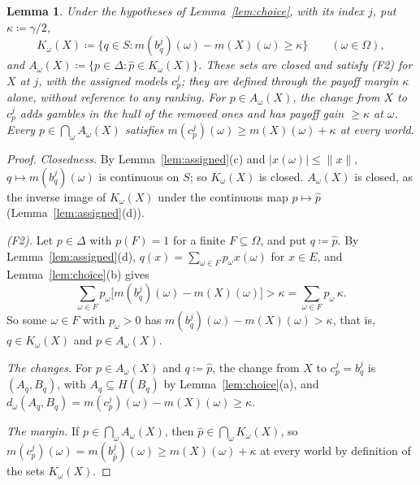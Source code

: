 \documentclass[11pt]{article}
\newtheorem{lemma}[theorem]{Lemma}
\theoremstyle{definition}
\begin{document}
\begin{lemma}\label{lem:witnesses}
Under the hypotheses of Lemma~\ref{lem:choice}, with its index $j$, put $\kappa\coloneqq\gamma/2$,
\[
K_\omega(X)\coloneqq\bigl\{q\in S:m(b^j_q)(\omega)-m(X)(\omega)\ge \kappa\bigr\}\qquad(\omega\in\Omega),
\]
and $A_\omega(X)\coloneqq\{p\in\Delta:\hat p\in K_\omega(X)\}$. {\color{red}These sets are closed and satisfy (F2) for $X$ at $j$, with the assigned models $c^j_p$; they are defined through the payoff margin $\kappa$ alone, without reference to any ranking. For $p\in A_\omega(X)$, the change from $X$ to $c^j_p$ adds gambles in the hull of the removed ones and has payoff gain $\ge\kappa$ at $\omega$.} Every $p\in\bigcap_\omega A_\omega(X)$ satisfies $m(c^j_p)(\omega)\ge m(X)(\omega)+\kappa$ at every world.
\end{lemma}
\begin{proof}
\emph{Closedness.} By Lemma~\ref{lem:assigned}(c) and $|x(\omega)|\le\|x\|$, $q\mapsto m(b^j_q)(\omega)$ is continuous on $S$; so $K_\omega(X)$ is closed. $A_\omega(X)$ is closed, as the inverse image of $K_\omega(X)$ under the continuous map $p\mapsto\hat p$ (Lemma~\ref{lem:assigned}(d)).

\emph{(F2).} Let $p\in\Delta$ with $p(F)=1$ for a finite $F\subseteq\Omega$, and put $q\coloneqq\hat p$. By Lemma~\ref{lem:assigned}(d), $q(x)=\sum_{\omega\in F}p_\omega x(\omega)$ for $x\in E$, and Lemma~\ref{lem:choice}(b) gives
\[
\sum_{\omega\in F}p_\omega\bigl[m(b^j_q)(\omega)-m(X)(\omega)\bigr]>\kappa=\sum_{\omega\in F}p_\omega\,\kappa .
\]
So some $\omega\in F$ with $p_\omega>0$ has $m(b^j_q)(\omega)-m(X)(\omega)>\kappa$, that is, $q\in K_\omega(X)$ and $p\in A_\omega(X)$.

{\color{red}\emph{The changes.} For $p\in A_\omega(X)$ and $q\coloneqq\hat p$, the change from $X$ to $c^j_p=b^j_q$ is $(A_q,B_q)$, with $A_q\subseteq H(B_q)$ by Lemma~\ref{lem:choice}(a), and $d_\omega(A_q,B_q)=m(c^j_p)(\omega)-m(X)(\omega)\ge\kappa$.}

\emph{The margin.} If $p\in\bigcap_\omega A_\omega(X)$, then $\hat p\in\bigcap_\omega K_\omega(X)$, so $m(c^j_p)(\omega)=m(b^j_{\hat p})(\omega)\ge m(X)(\omega)+\kappa$ at every world by definition of the sets $K_\omega(X)$.
\end{proof}
\end{document}
